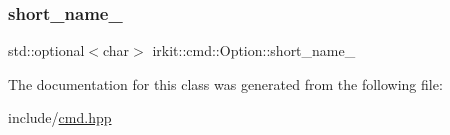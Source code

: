 \subsubsection{\texorpdfstring{short\+\_\+name\+\_\+}{short\_name\_}}
{\footnotesize\ttfamily std\+::optional$<$char$>$ irkit\+::cmd\+::\+Option\+::short\+\_\+name\+\_\+\hspace{0.3cm}{\ttfamily [protected]}}



The documentation for this class was generated from the following file\+:\begin{DoxyCompactItemize}
\item 
include/\mbox{\hyperlink{cmd_8hpp}{cmd.\+hpp}}\end{DoxyCompactItemize}
